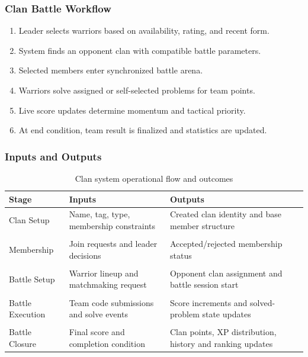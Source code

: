 \documentclass[12pt]{article}
\begin{document}
\subsubsection{Clan Battle Workflow}

\begin{enumerate}
\item Leader selects warriors based on availability, rating, and recent form.
\item System finds an opponent clan with compatible battle parameters.
\item Selected members enter synchronized battle arena.
\item Warriors solve assigned or self-selected problems for team points.
\item Live score updates determine momentum and tactical priority.
\item At end condition, team result is finalized and statistics are updated.
\end{enumerate}

\subsubsection{Inputs and Outputs}

\begin{table}[ht]
\centering
\begin{tabularx}{\textwidth}{>{\raggedright\arraybackslash}p{3.2cm} >{\raggedright\arraybackslash}X >{\raggedright\arraybackslash}X}
\toprule
\textbf{Stage} & \textbf{Inputs} & \textbf{Outputs} \\
\midrule
Clan Setup & Name, tag, type, membership constraints & Created clan identity and base member structure \\ \\
Membership & Join requests and leader decisions & Accepted/rejected membership status \\ \\
Battle Setup & Warrior lineup and matchmaking request & Opponent clan assignment and battle session start \\ \\
Battle Execution & Team code submissions and solve events & Score increments and solved-problem state updates \\ \\
Battle Closure & Final score and completion condition & Clan points, XP distribution, history and ranking updates \\
\bottomrule
\end{tabularx}
\caption{Clan system operational flow and outcomes}
\end{table}
\end{document}
